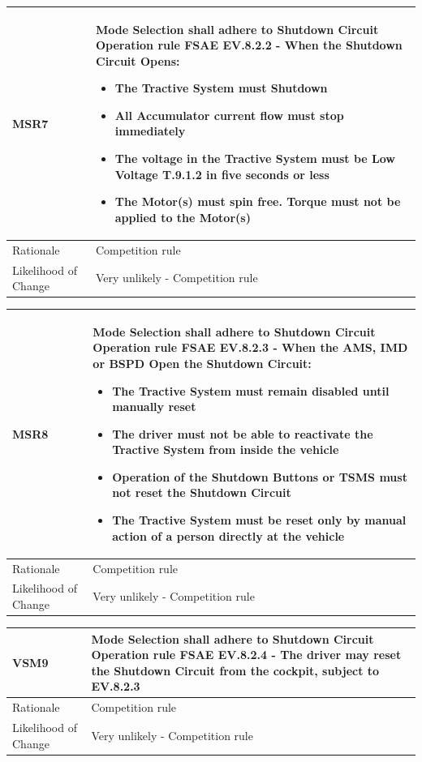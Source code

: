 \documentclass[12pt]{article}
\newcommand{\tableVspace}{5mm}
\newcommand{\ReqColA}{0.13\textwidth}
\newcommand{\ReqColB}{0.82\textwidth}
\begin{document}
\vspace{\tableVspace}
\noindent
\begin{tabular}{| p{\ReqColA} | p{\ReqColB}|}
\hline
\rowcolor[gray]{0.9}
MSR7 & Mode Selection shall adhere to Shutdown Circuit Operation rule FSAE EV.8.2.2 - When the Shutdown Circuit Opens:
\begin{itemize}
    \item The Tractive System must Shutdown
    \item All Accumulator current flow must stop immediately
    \item The voltage in the Tractive System must be Low Voltage T.9.1.2 in five seconds or less
    \item The Motor(s) must spin free. Torque must not be applied to the Motor(s)
\end{itemize} \\
\hline
Rationale & Competition rule\\
\hline
Likelihood of Change & Very unlikely - Competition rule \\
\hline
\end{tabular} 

\vspace{\tableVspace}
\noindent
\begin{tabular}{| p{\ReqColA} | p{\ReqColB}|}
\hline
\rowcolor[gray]{0.9}
MSR8 & Mode Selection shall adhere to Shutdown Circuit Operation rule FSAE EV.8.2.3 - When the AMS, IMD or BSPD Open the Shutdown Circuit:
\begin{itemize}
    \item The Tractive System must remain disabled until manually reset 
    \item The driver must not be able to reactivate the Tractive System from inside the vehicle
    \item Operation of the Shutdown Buttons or TSMS must not reset the Shutdown Circuit
    \item The Tractive System must be reset only by manual action of a person directly at the vehicle
\end{itemize} \\
\hline
Rationale & Competition rule\\
\hline
Likelihood of Change & Very unlikely - Competition rule \\
\hline
\end{tabular} 

\vspace{\tableVspace}
\noindent
\begin{tabular}{| p{\ReqColA} | p{\ReqColB}|}
\hline
\rowcolor[gray]{0.9}
VSM9 & Mode Selection shall adhere to Shutdown Circuit Operation rule FSAE EV.8.2.4 - The driver may reset the Shutdown Circuit from the cockpit, subject to EV.8.2.3 \\
\hline
Rationale & Competition rule\\
\hline
Likelihood of Change & Very unlikely - Competition rule \\
\hline
\end{tabular} 
\end{document}
